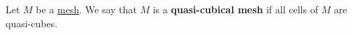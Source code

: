 \begin{definition}
  Let $M$ be a \hyperref[cmc:mesh:definition]{mesh}.
  We say that $M$ is a \textbf{quasi-cubical mesh}
  if all cells of $M$ are quasi-cubes.
\end{definition}
